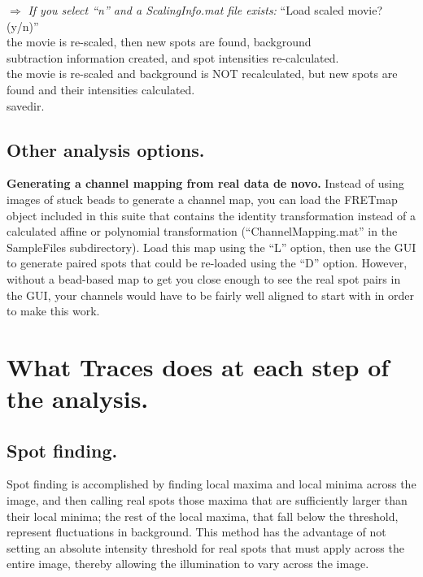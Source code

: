 \documentclass[11pt]{article}
\begin{document}
\indent\indent $\Rightarrow$ {\it If you select ``n'' and a ScalingInfo.mat file exists:} ``Load scaled movie? (y/n)''\\

\indent\indent\indent{} the movie is re-scaled, then new spots are found, background \\ 
\indent\indent\indent\indent\indent subtraction information created, and spot intensities re-calculated.\\

\indent\indent\indent{} the movie is re-scaled and background is NOT recalculated, but new
\indent\indent\indent\indent\indent spots are found and their intensities calculated.\\

 savedir.

\subsection{Other analysis options.}\label{sec:OtherOptions}

{\bf Generating a channel mapping from real data de novo.} Instead of using images of stuck beads to generate a channel map, you can load the FRETmap object included in this suite that contains the identity transformation instead of a calculated affine or polynomial transformation (``ChannelMapping.mat'' in the SampleFiles subdirectory). Load this map using the ``L'' option, then use the GUI to generate paired spots that could be re-loaded using the ``D'' option.  However, without a bead-based map to get you close enough to see the real spot pairs in the GUI, your channels would have to be fairly well aligned to start with in order to make this work.


\section{What Traces does at each step of the analysis.}\label{sec:WhatTracesDoes}

\subsection{Spot finding.}\label{sec:sptfindexplain}

Spot finding is accomplished by finding local maxima and local minima across the image, and then calling real spots those maxima that are sufficiently larger than their local minima; the rest of the local maxima, that fall below the threshold, represent fluctuations in background.  This method has the advantage of not setting an absolute intensity threshold for real spots that must apply across the entire image, thereby allowing the illumination to vary across the image.  
\end{document}
